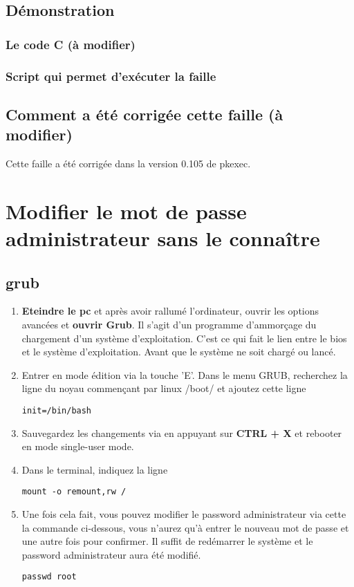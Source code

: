 \documentclass[a4paper, 12pt]{article}
\begin{document}
   		
   		\newpage
   		\subsection{Démonstration}
			\subsubsection{Le code C (à modifier) } 
			  
				
			\subsubsection{Script qui permet d'exécuter la faille}   	
			
		\subsection{Comment a été corrigée cette faille (à modifier)}
		Cette faille a été corrigée dans la version 0.105 de pkexec.

   \section{Modifier le mot de passe administrateur sans le connaître}
        \subsection{grub}
        \begin{enumerate}
        	\item \textbf{Eteindre le pc} et après avoir rallumé l'ordinateur, ouvrir les options avancées et \textbf{ouvrir Grub}. Il s'agit d'un programme d'ammorçage du chargement d'un système d'exploitation. C'est ce qui fait le lien entre le bios et le système d'exploitation. Avant que le système ne soit chargé ou lancé.
        	\item Entrer en mode édition via la touche 'E'. Dans le menu GRUB, recherchez la ligne du noyau commençant par linux /boot/ et ajoutez cette ligne
        	\begin{lstlisting}
init=/bin/bash
        	\end{lstlisting}
        	\item Sauvegardez les changements via en appuyant sur \textbf{CTRL + X} et rebooter en mode single-user mode.
        	\item Dans le terminal, indiquez la ligne
        	\begin{lstlisting}
mount -o remount,rw /
        	\end{lstlisting}
        	\item Une fois cela fait, vous pouvez modifier le password administrateur via cette la commande ci-dessous, vous n'aurez qu'à entrer le nouveau mot de passe et une autre fois pour confirmer. Il suffit de redémarrer le système et le password administrateur aura été modifié. 
        	\begin{lstlisting}
passwd root
        	\end{lstlisting}
        \end{enumerate}
\end{document}
